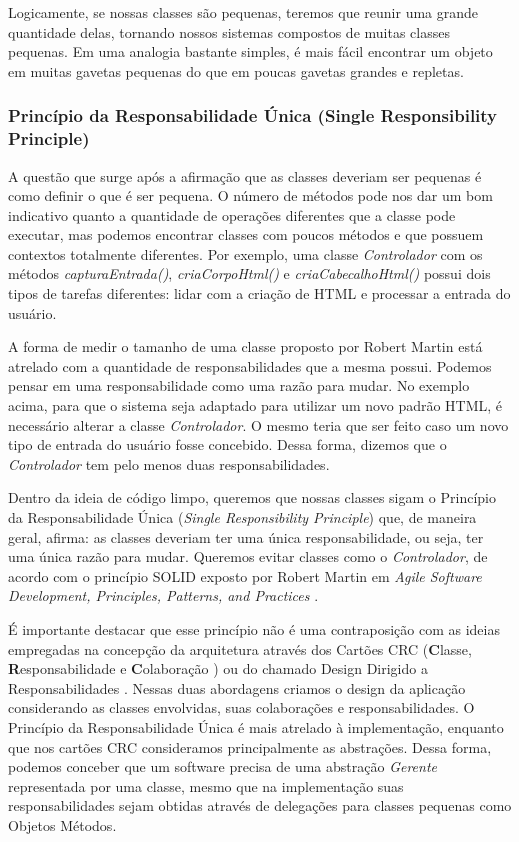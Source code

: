 Logicamente, se nossas classes são pequenas, teremos que reunir uma grande quantidade delas, tornando nossos sistemas compostos de muitas classes pequenas. Em uma analogia bastante simples, é mais fácil encontrar um objeto em muitas gavetas pequenas do que em poucas gavetas grandes e repletas.

\subsubsection{Princípio da Responsabilidade Única (Single Responsibility Principle)}    
\label{classes:srp}
A questão que surge após a afirmação que as classes deveriam ser pequenas é como definir o que é ser pequena. O número de métodos pode nos dar um bom indicativo quanto a quantidade de operações diferentes que a classe pode executar, mas podemos encontrar classes com poucos métodos e que possuem contextos totalmente diferentes. Por exemplo, uma classe \textit{Controlador} com os métodos \textit{capturaEntrada()}, \textit{criaCorpoHtml()} e \textit{criaCabecalhoHtml()} possui dois tipos de tarefas diferentes: lidar com a criação de HTML e processar a entrada do usuário.
	
A forma de medir o tamanho de uma classe proposto por Robert Martin está atrelado com a quantidade de responsabilidades que a mesma possui. Podemos pensar em uma responsabilidade como uma razão para mudar. No exemplo acima, para que o sistema seja adaptado para utilizar um novo padrão HTML, é necessário alterar a classe \textit{Controlador}. O mesmo teria que ser feito caso um novo tipo de entrada do usuário fosse concebido. Dessa forma, dizemos que o \textit{Controlador} tem pelo menos duas responsabilidades.
	
Dentro da ideia de código limpo, queremos que nossas classes sigam o Princípio da Responsabilidade Única (\textit{Single Responsibility Principle}) que, de maneira geral, afirma: as classes deveriam ter uma única responsabilidade, ou seja, ter uma única razão para mudar. Queremos evitar classes como o \textit{Controlador}, de acordo com o princípio SOLID exposto por Robert Martin em \textit{Agile Software Development, Principles, Patterns, and Practices} \citep{Martin2002}.

É importante destacar que esse princípio não é uma contraposição com as ideias empregadas na concepção da arquitetura através dos Cartões CRC (\textbf{C}lasse, \textbf{R}esponsabilidade e \textbf{C}olaboração \citep{crc89})  ou do chamado Design Dirigido a Responsabilidades \citep{Wirfs-Brock03}. Nessas duas abordagens criamos o design da aplicação considerando as classes envolvidas, suas colaborações e responsabilidades. O Princípio da Responsabilidade Única é mais atrelado à implementação, enquanto que nos cartões CRC consideramos principalmente as abstrações. Dessa forma, podemos conceber que um software precisa de uma abstração \textit{Gerente} representada por uma classe, mesmo que na implementação suas responsabilidades sejam obtidas através de delegações para classes pequenas como Objetos Métodos.

